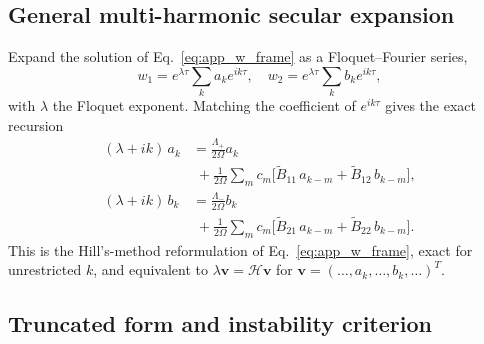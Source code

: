 \subsection{General multi-harmonic secular expansion}
\label{app:general_hill}

Expand the solution of Eq.~\eqref{eq:app_w_frame} as a Floquet--Fourier series,
%
\begin{equation}
    w_1 = e^{\lambda\tau}\!\sum_{k} a_k e^{ik\tau}, \quad
    w_2 = e^{\lambda\tau}\!\sum_{k} b_k e^{ik\tau},
    \label{eq:app_floquet_ansatz}
\end{equation}
%
with $\lambda$ the Floquet exponent. Matching the coefficient of $e^{ik\tau}$ gives the exact recursion
%
\begin{align}
    (\lambda+ik)\,a_k &= \frac{\Lambda_+}{2\Omega}a_k \nonumber\\
    &\;+ \frac{1}{2\Omega}\sum_{m}c_m\big[\tilde B_{11}\,a_{k-m}+\tilde B_{12}\,b_{k-m}\big], \label{eq:app_recursion_a}\\
    (\lambda+ik)\,b_k &= \frac{\Lambda_-}{2\Omega}b_k \nonumber\\
    &\;+ \frac{1}{2\Omega}\sum_{m}c_m\big[\tilde B_{21}\,a_{k-m}+\tilde B_{22}\,b_{k-m}\big]. \label{eq:app_recursion_b}
\end{align}
%
This is the Hill's-method reformulation of Eq.~\eqref{eq:app_w_frame}, exact for unrestricted $k$, and equivalent to $\lambda\mathbf v=\mathcal H\mathbf v$ for $\mathbf v=(\dots,a_k,\dots,b_k,\dots)^T$.

\subsection{Truncated form and instability criterion}
\label{app:truncation}

